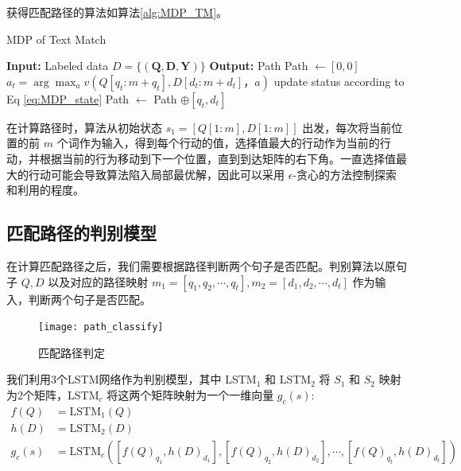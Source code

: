 获得匹配路径的算法如算法\ref{alg:MDP_TM}。
\begin{algorithm}[!htbp]
    \small
    \caption{MDP of Text Match}\label{alg:MDP_TM}
    \renewcommand{\algorithmicrequire}{\textbf{Input:}}
    \renewcommand{\algorithmicensure}{\textbf{Output:}}
    \begin{algorithmic}
        \STATE \textbf{Input:} Labeled data $D=\{ (\mathbf{Q}, \mathbf{D}, \mathbf{Y}) \}$
        \STATE \textbf{Output:} Path
        \STATE {} Path $\leftarrow [0, 0]$
        \STATE $a_t = \arg\max_a v(Q [q_t:m+q_t], D [d_t:m+d_t]， a)$
        \STATE update status according to Eq \ref{eq:MDP_state}
        \STATE Path $\leftarrow$ Path $\oplus [q_t, d_t]$ 
        \ENDWHILE
    \end{algorithmic}
\end{algorithm}

在计算路径时，算法从初始状态 $s_1 = [Q[1:m], D[1:m]]$ 出发，每次将当前位置的前 $m$ 个词作为输入，得到每个行动的值，选择值最大的行动作为当前的行动，并根据当前的行为移动到下一个位置，直到到达矩阵的右下角。一直选择值最大的行动可能会导致算法陷入局部最优解，因此可以采用 $\epsilon$-贪心的方法控制探索和利用的程度。

\subsection{匹配路径的判别模型}
\label{sec:path_classify}

在计算匹配路径之后，我们需要根据路径判断两个句子是否匹配。判别算法以原句子 $Q, D$ 以及对应的路径映射 $m_1 = [q_1, q_2, \cdots, q_t], m_2 = [d_1, d_2, \cdots, d_t]$ 作为输入，判断两个句子是否匹配。
\begin{figure}[!htbp]
    \centering
    \vspace{1em}
    \texttt{[image: path\_classify]}
    \caption{匹配路径判定}
    \label{fig:path_classify}
    \vspace{1em}
\end{figure}

我们利用3个LSTM网络作为判别模型，其中 LSTM$_1$ 和 LSTM$_2$ 将 $S_1$ 和 $S_2$ 映射为2个矩阵，LSTM$_c$ 将这两个矩阵映射为一个一维向量 $g_c(s)$:
$$
\begin{aligned}
f(Q) &= \text{LSTM}_1(Q) \\
h(D) &= \text{LSTM}_2(D) \\
g_c(s) &= \text{LSTM}_c([{f(Q)}_{q_1}, {h(D)}_{d_1}], [{f(Q)}_{q_2}, {h(D)}_{d_2}], \cdots, [{f(Q)}_{q_t}, {h(D)}_{d_t}])
\end{aligned}
$$

